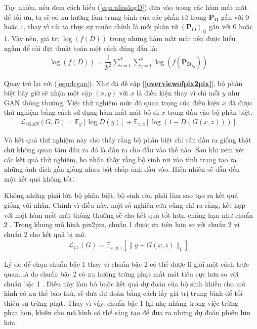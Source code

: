 \documentclass[a4paper, 12pt]{report}
\begin{document}
Tuy nhiên, nếu đem cách hiểu (\ref{eqn:aliaslogD}) đưa vào trong các hàm mất mát để tối ưu, ta sẽ có xu hướng làm trung bình của các phần tử trong $\mathbf{P_D}$ gần với $0$ hoặc $1$, thay vì cái ta thực sự muốn chính là mỗi phần tử $\left(\mathbf{P_D}\right)_{ij}$ gần với $0$ hoặc $1$.
Vậy nên, giá trị $\log\left(f\left(D\right)\right)$ trong những hàm mất mát nên được hiểu ngầm để cài đặt thuật toán một cách đúng đắn là:
\begin{align}
    \log\left(f\left(D\right)\right) = \dfrac{1}{k^2}\sum_{i=1}^k\sum_{j=1}^k\log\left(f\left(\mathbf{P_D}_{ij}\right)\right)
\end{align}

Quay trở lại với (\ref{eqn:lcgan}).
Như đã đề cập [\textbf{\ref{overviewofpix2pix}}], bộ phân biệt bây giờ sẽ nhận một cặp $(x, y)$ với $x$ là điều kiện thay vì chỉ mỗi $y$ như GAN thông thường.
Việc thử nghiệm mức độ quan trọng của điều kiện $x$ đã được thử nghiệm \cite{isola2018imagetoimage} bằng cách sử dụng hàm mất mát bỏ đi $x$ trong đầu vào bộ phân biệt:
\begin{align}
    \mathcal{L}_{cGAN}\left(G, D\right) = \mathbb{E}_{y}\left[\log D\left(y\right)\right] + \mathbb{E}_{x, z}\left[\log\left(1-D\left(G\left(x, z\right)\right)\right)\right]\label{eqn:lcganwocondition}
\end{align}

Và kết quả thử nghiệm này cho thấy rằng bộ phân biệt chỉ cần đầu ra giống thật chứ không quan tâm đầu ra đó là đầu ra cho đầu vào thế nào.
Sau khi xem xét các kết quả thử nghiệm, họ nhận thấy rằng bộ sinh rơi vào tình trạng tạo ra những ảnh đích gần giống nhau bất chấp ảnh đầu vào.
Hiển nhiên sẽ dẫn đến một kết quả không tốt.\vspace{5pt}

Không những phải lừa bộ phân biệt, bộ sinh còn phải làm sao tạo ra kết quả giống với nhãn.
Chính vì điều này, một số nghiên cứu cũng chỉ ra rằng, kết hợp với một hàm mất mát thông thường sẽ cho kết quả tốt hơn, chẳng hạn như chuẩn 2 \cite{pathak2016context}.
Trong khung mô hình pix2pix, chuẩn 1 được ưu tiên hơn so với chuẩn 2 vì chuẩn 2 cho kết quả bị mờ.
\begin{align}
    \mathcal{L}_{L1}\left(G\right) = \mathbb{E}_{x, y, z}\left[\lVert y - G\left(x, z\right) \rVert_1\right]\label{eqn:l1lossforgan}
\end{align}

Lý do để chọn chuẩn bậc 1 thay vì chuẩn bậc 2 có thể được lí giải một cách trực quan, là do chuẩn bậc 2 có xu hướng trừng phạt mất mát tiêu cực hơn so với chuẩn bậc 1 \cite{replynorm1ornorm2}.
Điều này làm bó buộc kết quả dự đoán của bộ sinh khiến cho mô hình có xu thế bảo thủ, sẽ đưa dự đoán bằng cách lấy giá trị trung bình để tối thiểu sự trừng phạt.
Thay vì vậy, chuẩn bậc 1 lại nhẹ nhàng trong việc trừng phạt hơn, khiến cho mô hình có thể sáng tạo để đưa ra những dự đoán phiêu lưu hơn.\vspace{5pt}
\end{document}
